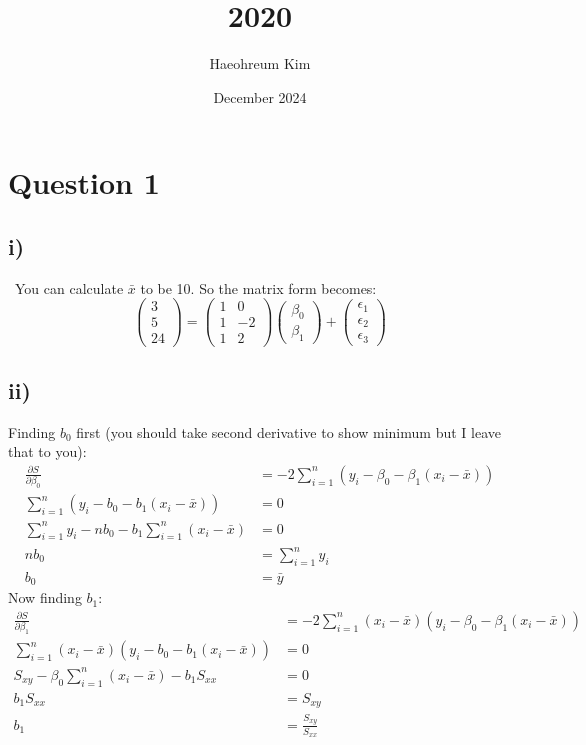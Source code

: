 \documentclass{article}
\title{2020}
\author{Haeohreum Kim}
\date{December 2024}
\begin{document}
\maketitle
\section*{Question 1}
\subsection*{i)}\
You can calculate $\bar{x}$ to be 10. So the matrix form becomes:
$$ \begin{pmatrix}
    3 \\ 5 \\ 24
\end{pmatrix} = 
\begin{pmatrix}
    1 & 0 \\ 1 & -2 \\ 1 & 2 
\end{pmatrix}
\begin{pmatrix}
    \beta_0 \\ \beta_1
\end{pmatrix} + 
\begin{pmatrix}
    \epsilon_1 \\ \epsilon_2 \\ \epsilon_3
\end{pmatrix}
$$

\subsection*{ii)}
Finding $b_0$ first (you should take second derivative to show minimum but I leave that to you):
\begin{align*}
    \frac{\partial S}{\partial\beta_0} &= -2\sum_{i=1}^n(y_i - \beta_0 - \beta_1(x_i - \bar{x})) \\ 
    \sum_{i=1}^n(y_i - b_0 - b_1(x_i - \bar{x})) &= 0 \\ 
    \sum_{i=1}^ny_i - nb_0 - b_1\sum_{i=1}^n(x_i - \bar{x}) &= 0\\
    nb_0 &= \sum_{i=1}^ny_i \\ 
    b_0 &= \bar{y} 
\end{align*}
Now finding $b_1$:
\begin{align*}
    \frac{\partial S}{\partial\beta_1} &= -2\sum_{i=1}^n(x_i-\bar{x})(y_i - \beta_0 - \beta_1(x_i-\bar{x})) \\ 
    \sum_{i=1}^n(x_i-\bar{x})(y_i - b_0 - b_1(x_i-\bar{x})) &= 0 \\ 
    S_{xy} - \beta_0\sum_{i=1}^n(x_i - \bar{x}) - b_1S_{xx} &= 0 \\ 
    b_1S_{xx} &= S_{xy} \\ 
    b_1 &= \frac{S_{xy}}{S_{xx}}
\end{align*}
\end{document}
